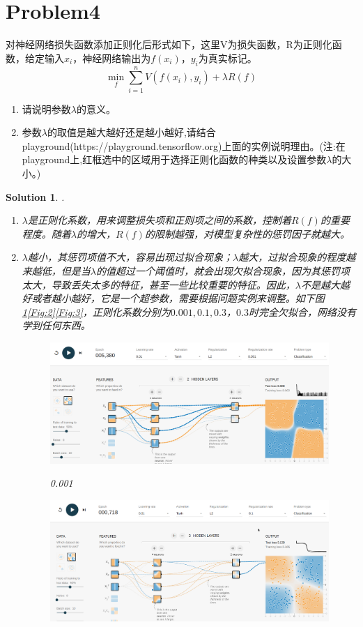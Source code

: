 \documentclass[a4paper,UTF8]{article}
\numberwithin{equation}{section}
\newtheorem*{solution}{Solution}
\begin{document}
\section*{Problem4}
对神经网络损失函数添加正则化后形式如下，这里V为损失函数，R为正则化函数，给定输入$x_i$，神经网络输出为$f(x_i)$，$y_i$为真实标记。$$\min_f\sum_{i=1}^{n}V(f(x_i),y_i)+\lambda R(f)$$
\begin{enumerate}[(1)]
	\item 请说明参数$\lambda$的意义。
	\item 参数$\lambda$的取值是越大越好还是越小越好,请结合playground(https://playground.tensorflow.org)上面的实例说明理由。(注:在playground上,红框选中的区域用于选择正则化函数的种类以及设置参数$\lambda$的大小。)
\end{enumerate}
\begin{solution}.
	\begin{enumerate}[(1)]
		\item $\lambda$是正则化系数，用来调整损失项和正则项之间的系数，控制着$R(f)$的重要程度。随着$\lambda$的增大，$R(f)$的限制越强，对模型复杂性的惩罚因子就越大。
		\item $\lambda$越小，其惩罚项值不大，容易出现过拟合现象；$\lambda$越大，过拟合现象的程度越来越低，但是当$\lambda$的值超过一个阈值时，就会出现欠拟合现象，因为其惩罚项太大，导致丢失太多的特征，甚至一些比较重要的特征。因此，$\lambda$不是越大越好或者越小越好，它是一个超参数，需要根据问题实例来调整。如下图\ref{Fig:1}\ref{Fig:2}\ref{Fig:3}，正则化系数分别为$0.001,0.1,0.3$，$0.3$时完全欠拟合，网络没有学到任何东西。
			\begin{figure}[!htb]
			\centering
			\includegraphics[width=1\textwidth]{pic/3.png}
			\label{Fig:1}
			\caption{0.001}
		\end{figure}
		\begin{figure}[!htb]
			\centering
			\includegraphics[width=1\textwidth]{pic/1.png}

\end{figure}
\end{enumerate}
\end{solution}
\end{document}
